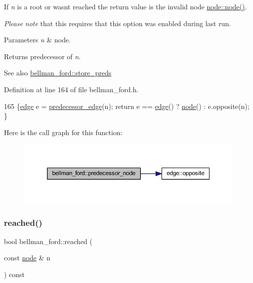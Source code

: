 If {\itshape n} is a root or wasn\textquotesingle{}t reached the return value is the invalid node \mbox{\hyperlink{classnode_a6da4ea35f222059db9a59cf40be459f9}{node\+::node()}}.

{\itshape Please} {\itshape note} that this requires that this option was enabled during last run.


\begin{DoxyParams}{Parameters}
{\em n} & node. \\
\hline
\end{DoxyParams}
\begin{DoxyReturn}{Returns}
predecessor of {\itshape n}. 
\end{DoxyReturn}
\begin{DoxySeeAlso}{See also}
\mbox{\hyperlink{classbellman__ford_aac87169a3cf4f95477ce215a0cb7a12b}{bellman\+\_\+ford\+::store\+\_\+preds}} 
\end{DoxySeeAlso}


Definition at line 164 of file bellman\+\_\+ford.\+h.


\begin{DoxyCode}
165     \{\mbox{\hyperlink{classedge}{edge}} e = \mbox{\hyperlink{classbellman__ford_a39f93b0b1e427cf26059fa6141c6f61c}{predecessor\_edge}}(n); \textcolor{keywordflow}{return} e == \mbox{\hyperlink{classedge}{edge}}() ? 
      \mbox{\hyperlink{classnode}{node}}() : e.opposite(n); \}
\end{DoxyCode}
Here is the call graph for this function\+:\nopagebreak
\begin{figure}[H]
\begin{center}
\leavevmode
\includegraphics[width=350pt]{classbellman__ford_a403e286ec8cbe3c30a7a729c5041155e_cgraph}
\end{center}
\end{figure}
\mbox{\label{classbellman__ford_a93f7c34ec9662690230ca7a9c31933cd}} 
\subsubsection{\texorpdfstring{reached()}{reached()}}
{\footnotesize\ttfamily bool bellman\+\_\+ford\+::reached (\begin{DoxyParamCaption}\item[{const \mbox{\hyperlink{classnode}{node}} \&}]{n }\end{DoxyParamCaption}) const\hspace{0.3cm}{\ttfamily [inline]}}



